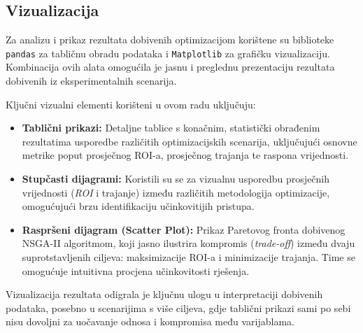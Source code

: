 \subsection{Vizualizacija}

Za analizu i prikaz rezultata dobivenih optimizacijom korištene su biblioteke 
\texttt{pandas} za tabličnu obradu podataka i \texttt{Matplotlib} \cite{Hunter2007} 
za grafičku vizualizaciju.  
Kombinacija ovih alata omogućila je jasnu i preglednu prezentaciju rezultata 
dobivenih iz eksperimentalnih scenarija.

Ključni vizualni elementi korišteni u ovom radu uključuju:

\begin{itemize}
    \item \textbf{Tablični prikazi:} Detaljne tablice s konačnim, statistički obrađenim rezultatima 
    usporedbe različitih optimizacijskih scenarija, uključujući osnovne metrike 
    poput prosječnog ROI-a, prosječnog trajanja te raspona vrijednosti.

    \item \textbf{Stupčasti dijagrami:} Koristili su se za vizualnu usporedbu prosječnih vrijednosti 
    (\textit{ROI} i trajanje) između različitih metodologija optimizacije, omogućujući brzu identifikaciju 
    učinkovitijih pristupa.

    \item \textbf{Raspršeni dijagram (Scatter Plot):} Prikaz Paretovog fronta dobivenog NSGA-II algoritmom, 
    koji jasno ilustrira kompromis (\textit{trade-off}) između dvaju suprotstavljenih ciljeva:
    maksimizacije ROI-a i minimizacije trajanja. Time se omogućuje intuitivna procjena 
    učinkovitosti rješenja.
\end{itemize}

Vizualizacija rezultata odigrala je ključnu ulogu u interpretaciji dobivenih podataka, 
posebno u scenarijima s više ciljeva, gdje tablični prikazi sami po sebi nisu dovoljni 
za uočavanje odnosa i kompromisa među varijablama.

